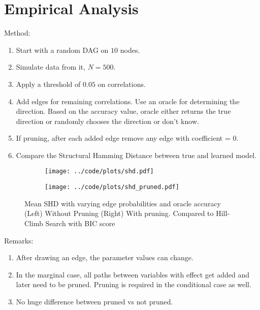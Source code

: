 \documentclass[letterpaper]{article}
\begin{document}
\section{Empirical Analysis}

Method:
\begin{enumerate}
	\item Start with a random DAG on $ 10 $ nodes.
	\item Simulate data from it, $ N = 500 $.
	\item Apply a threshold of $ 0.05 $ on correlations.
	\item Add edges for remaining correlations. Use an oracle for determining the direction. Based on the accuracy value, oracle either returns the true direction or randomly chooses the direction or don't know.
	\item If pruning, after each added edge remove any edge with coefficient = 0.
	\item Compare the Structural Hamming Distance between true and learned model.
\end{enumerate}

\begin{figure}[H]
	\begin{subfigure}{0.5 \textwidth}
		\centering
		\texttt{[image: ../code/plots/shd.pdf]}
	\end{subfigure}%
	\begin{subfigure}{0.5 \textwidth}
		\centering
		\texttt{[image: ../code/plots/shd\_pruned.pdf]}
	\end{subfigure}
		\caption{Mean SHD with varying edge probabilities and oracle accuracy (Left) Without Pruning (Right) With pruning. Compared to Hill-Climb Search with BIC score}
\end{figure}

Remarks:
\begin{enumerate}
	\item After drawing an edge, the parameter values can change.
	\item In the marginal case, all paths between variables with effect get added and later need to be pruned. Pruning is required in the conditional case as well.
	\item No huge difference between pruned vs not pruned.
\end{enumerate}
\end{document}
